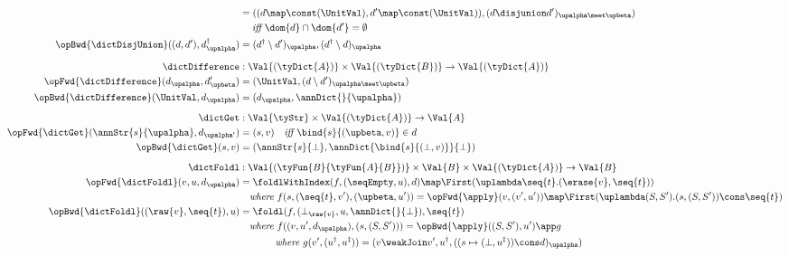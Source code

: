 \begin{figure}
\begin{align*}
   &=
   ((d \map \const(\UnitVal), d' \map \const(\UnitVal)), (d \disjunion d')_{\upalpha \meet \upbeta})
   \\
   &\quad\;\textit{iff }\dom{d} \cap \dom{d'} = \emptyset
   \\
   \opBwd{\dictDisjUnion}((d, d'), d^\dagger_{\upalpha}) &=
      (d^\dagger \setminus d')_{\upalpha},
      (d^\dagger \setminus d)_{\upalpha}
   \\[2mm]
   \dictDifference &: \Val{(\tyDict{A})} \times \Val{(\tyDict{B})} \to \Val{(\tyDict{A})}
   \\
   \opFwd{\dictDifference}(d_{\upalpha}, d'_{\upbeta})
   &=
   (\UnitVal, (d \setminus d')_{\upalpha \meet \upbeta})
   \\
   \opBwd{\dictDifference}(\UnitVal, d_{\upalpha}) &= (d_{\upalpha}, \annDict{}{\upalpha})
   \\[2mm]
   \dictGet &: \Val{\tyStr} \times \Val{(\tyDict{A})} \to \Val{A}
   \\
   \opFwd{\dictGet}(\annStr{s}{\upalpha}, d_{\upalpha'}) &= (s, v)
   \quad\textit{iff }\bind{s}{(\upbeta, v)} \in d
   \\
   \opBwd{\dictGet}(s, v) &= (\annStr{s}{\bot}, \annDict{\bind{s}{(\bot, v)}}{\bot})
   \\[2mm]
   \dictFoldl &: \Val{(\tyFun{B}{\tyFun{A}{B}})} \times \Val{B} \times \Val{(\tyDict{A})} \to \Val{B}
   \\
   \opFwd{\dictFoldl}(v, u, d_\upalpha) &= \foldlWithIndex(f, (\seqEmpty, u), d) \map \First(\uplambda\seq{t}.(\erase{v}, \seq{t}))
   \\
   &\quad\textit{where }
   f(s, (\seq{t}, v'), (\upbeta, u')) = \opFwd{\apply}(v, (v', u')) \map \First(\uplambda (S, S').(s, (S, S')) \cons \seq{t})
   \\
   \opBwd{\dictFoldl}((\raw{v}, \seq{t}), u) &=
   \foldl(f, (\bot_{\raw{v}}, u, \annDict{}{\bot}), \seq{t})
   \\
   &\quad\textit{where }
   f((v, u', d_{\upalpha}), (s, (S, S'))) = \opBwd{\apply}((S, S'), u') \app g
   \\
   &\quad\phantom{\textit{where}\,}\textit{where }
   g(v', (u^\dagger, u^\ddagger)) = (v \weakJoin v', u^\dagger, ((s \mapsto (\bot, u^\ddagger)) \cons d)_{\upalpha})

\end{align*}
\end{figure}
